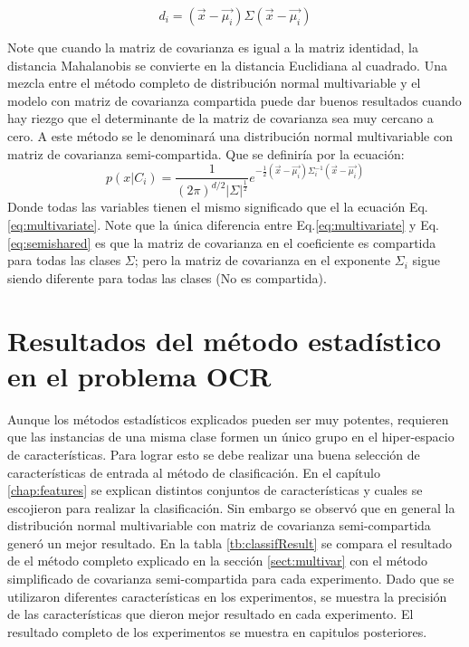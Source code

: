 \documentclass[a4paper, 11pt, oneside]{report}
\begin{document}
\begin{equation}
	\label{eq:mahalanobis}
	d_i = (\vec{x}-\vec{\mu_i})\Sigma(\vec{x}-\vec{\mu_i}) 
\end{equation}

Note que cuando la matriz de covarianza es igual a la matriz identidad, la distancia Mahalanobis se convierte en la distancia Euclidiana al cuadrado.\newline \newline
Una mezcla entre el método completo de distribución normal multivariable y el modelo con matriz de covarianza compartida puede dar buenos resultados cuando hay riezgo que el determinante de la matriz de covarianza sea muy cercano a cero. A este método se le denominará una distribución normal multivariable con matriz de covarianza semi-compartida. Que se definiría por la ecuación:
\begin{equation}\label{eq:semishared}
	p(x|C_i) = \frac{1}{(2\pi)^{d/2}|\Sigma|^\frac{1}{2}} e^{-\frac{1}{2}(\vec{x}-\vec{\mu_i})\Sigma_i^{-1}(\vec{x}-\vec{\mu_i})}
\end{equation}
Donde todas las variables tienen el mismo significado que el la ecuación Eq.\ref{eq:multivariate}. Note que la única diferencia entre Eq.\ref{eq:multivariate} y Eq.\ref{eq:semishared} es que la matriz de covarianza en el coeficiente es compartida para todas las clases $\Sigma$; pero la matriz de covarianza en el exponente $\Sigma_i$ sigue siendo diferente para todas las clases (No es compartida).

\section{Resultados del método estadístico en el problema OCR}	

Aunque los métodos estadísticos explicados pueden ser muy potentes, requieren que las instancias de una misma clase formen un único grupo en el hiper-espacio de características. Para lograr esto se debe realizar una buena selección de características de entrada al método de clasificación. En el capítulo \ref{chap:features} se explican distintos conjuntos de características y cuales se escojieron para realizar la clasificación. Sin embargo se observó que en general la distribución normal multivariable con matriz de covarianza semi-compartida generó un mejor resultado. En la tabla \ref{tb:classifResult} se compara el resultado de el método completo explicado en la sección \ref{sect:multivar} con el método simplificado de covarianza semi-compartida para cada experimento. Dado que se utilizaron diferentes características en los experimentos, se muestra la precisión de las características que dieron mejor resultado en cada experimento. El resultado completo de los experimentos se muestra en capitulos posteriores.
\end{document}
